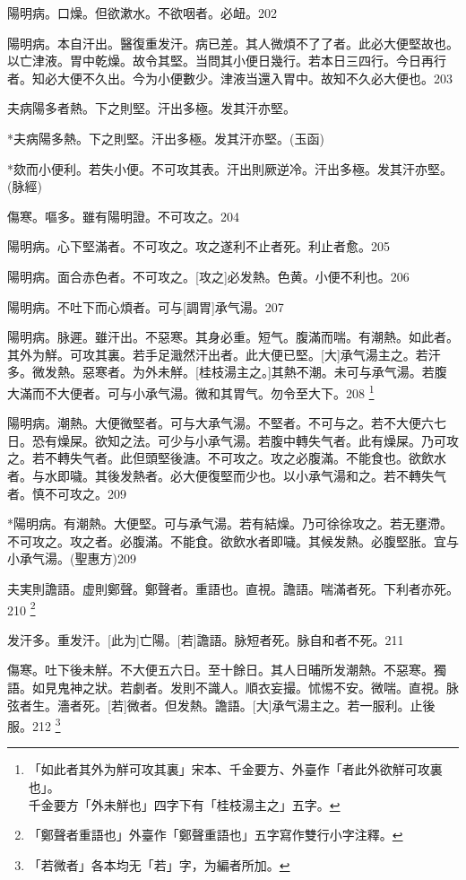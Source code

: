 \documentclass[12pt,oneside,UTF8,b5paper]{ctexbook}她她她她她她她
\begin{document}
陽明病。口燥。但欲漱水。不欲咽者。必衄。202

陽明病。本自汗出。醫復重发汗。病已差。其人微煩不了了者。此必大便堅故也。以亡津液。胃中乾燥。故令其堅。当問其小便日幾行。若本日三四行。今日再行者。知必大便不久出。今为小便數少。津液当還入胃中。故知不久必大便也。203

夫病陽多者熱。下之則堅。汗出多極。发其汗亦堅。

*夫病陽多熱。下之則堅。汗出多極。发其汗亦堅。(玉函)

*欬而小便利。若失小便。不可攻其表。汗出則厥逆冷。汗出多極。发其汗亦堅。(脉經)

傷寒。嘔多。雖有陽明證。不可攻之。204

陽明病。心下堅滿者。不可攻之。攻之遂利不止者死。利止者愈。205

陽明病。面合赤色者。不可攻之。[攻之]必发熱。色黄。小便不利也。206

陽明病。不吐下而心煩者。可与[調胃]承气湯。207

陽明病。脉遲。雖汗出。不惡寒。其身必重。短气。腹滿而喘。有潮熱。如此者。其外为觧。可攻其裏。若手足濈然汗出者。此大便已堅。[大]承气湯主之。若汗多。微发熱。惡寒者。为外未觧。[桂枝湯主之。]其熱不潮。未可与承气湯。若腹大滿而不大便者。可与小承气湯。微和其胃气。勿令至大下。208
	\footnote{「如此者其外为觧可攻其裏」宋本、千金要方、外臺作「者此外欲觧可攻裏也」。\\千金要方「外未觧也」四字下有「桂枝湯主之」五字。}

陽明病。潮熱。大便微堅者。可与大承气湯。不堅者。不可与之。若不大便六七日。恐有燥屎。欲知之法。可少与小承气湯。若腹中轉失气者。此有燥屎。乃可攻之。若不轉失气者。此但頭堅後溏。不可攻之。攻之必腹滿。不能食也。欲飲水者。与水即噦。其後发熱者。必大便復堅而少也。以小承气湯和之。若不轉失气者。慎不可攻之。209

*陽明病。有潮熱。大便堅。可与承气湯。若有結燥。乃可徐徐攻之。若无壅滯。不可攻之。攻之者。必腹滿。不能食。欲飲水者即噦。其候发熱。必腹堅胀。宜与小承气湯。(聖惠方)209

夫実則譫語。虚則鄭聲。鄭聲者。重語也。直視。譫語。喘滿者死。下利者亦死。210
	\footnote{「鄭聲者重語也」外臺作「鄭聲重語也」五字寫作雙行小字注釋。}

发汗多。重发汗。[此为]亡陽。[若]譫語。脉短者死。脉自和者不死。211

傷寒。吐下後未觧。不大便五六日。至十餘日。其人日晡所发潮熱。不惡寒。獨語。如見鬼神之狀。若劇者。发則不識人。順衣妄撮。怵惕不安。微喘。直視。脉弦者生。濇者死。[若]微者。但发熱。譫語。[大]承气湯主之。若一服利。止後服。212
	\footnote{「若微者」各本均无「若」字，为編者所加。}
\end{document}
